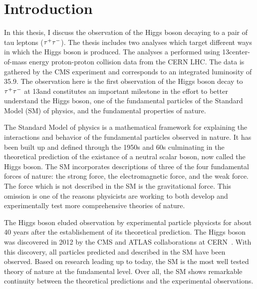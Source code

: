 \chapter{Introduction}
\label{sec:introduction}

In this thesis, I discuss the observation of the Higgs boson decaying to a pair
of tau leptons ($\tau^{+}\tau^{-}$). The thesis includes two analyses which target different
ways in which the Higgs boson is produced. The analyses a performed using
13\TeV center-of-mass energy proton-proton collision data from the CERN LHC.
The data is gathered by the CMS experiment and corresponds to an integrated
luminosity of 35.9\fbinv. The observation here is the first observation of the
Higgs boson decay to $\tau^{+}\tau^{-}$ at 13\TeV and constitutes an important
milestone in the effort to better understand the Higgs boson, one of the fundamental
particles of the Standard Model (SM) of physics, and the fundamental
properties of nature.

The Standard Model of physics is a mathematical framework for explaining
the interactions and behavior of the fundamental particles observed in nature.
It has been built up and defined through the 1950s and 60s culminating in the
theoretical prediction of the existance of a neutral scalar boson, now called the
Higgs boson.
The SM incorporates descriptions of three of the four fundamental forces of nature:
the strong force, the electromagnetic force, and the weak force.
The force which is not described in the SM is the gravitational force. This omission is one of the reasons
physicists are working to both develop and experimentally test more comprehensive 
theories of nature.

The Higgs boson eluded observation by experimental particle physicsts
for about 40 years after the establishement of its theoretical prediction. 
The Higgs boson was discovered in 2012
by the CMS and ATLAS collaborations at CERN~\cite{Aad:2012tfa, Chatrchyan:2012xdj, Chatrchyan:2013lba}.
With this discovery, all particles predicted and described in the SM have been observed.
Based on research leading up to today, the SM is the most well tested theory of nature at the fundamental level.
Over all, the SM shows remarkable continuity between the theoretical predictions and
the experimental observations. 

